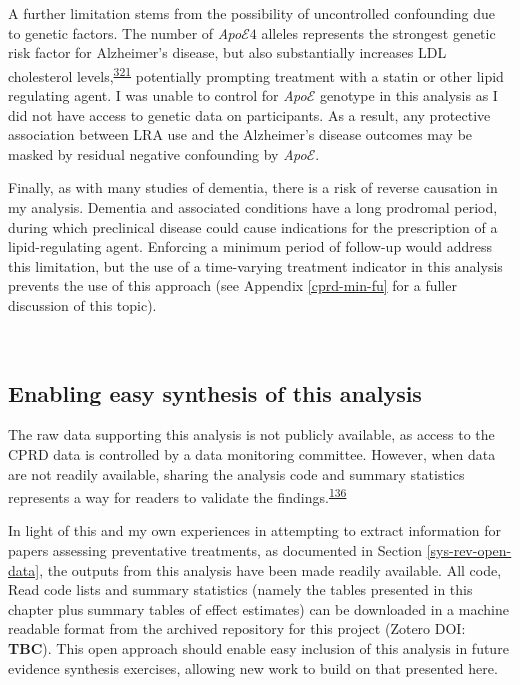\documentclass[a4paper, twoside]{templates/ociamthesis}
\begin{document}
A further limitation stems from the possibility of uncontrolled confounding due to genetic factors. The number of \emph{Apo}\(\mathcal{E}4\) alleles represents the strongest genetic risk factor for Alzheimer's disease, but also substantially increases LDL cholesterol levels,\textsuperscript{\protect\hyperlink{ref-bennet2007}{321}} potentially prompting treatment with a statin or other lipid regulating agent. I was unable to control for \emph{Apo}\(\mathcal{E}\) genotype in this analysis as I did not have access to genetic data on participants. As a result, any protective association between LRA use and the Alzheimer's disease outcomes may be masked by residual negative confounding by \emph{Apo}\(\mathcal{E}\).

Finally, as with many studies of dementia, there is a risk of reverse causation in my analysis. Dementia and associated conditions have a long prodromal period, during which preclinical disease could cause indications for the prescription of a lipid-regulating agent. Enforcing a minimum period of follow-up would address this limitation, but the use of a time-varying treatment indicator in this analysis prevents the use of this approach (see Appendix \ref{cprd-min-fu} for a fuller discussion of this topic).

~

\hypertarget{cprd-data-avail}{%
\subsection{Enabling easy synthesis of this analysis}\label{cprd-data-avail}}

The raw data supporting this analysis is not publicly available, as access to the CPRD data is controlled by a data monitoring committee. However, when data are not readily available, sharing the analysis code and summary statistics represents a way for readers to validate the findings.\textsuperscript{\protect\hyperlink{ref-goldacre2019}{136}}

In light of this and my own experiences in attempting to extract information for papers assessing preventative treatments, as documented in Section \ref{sys-rev-open-data}, the outputs from this analysis have been made readily available. All code, Read code lists and summary statistics (namely the tables presented in this chapter plus summary tables of effect estimates) can be downloaded in a machine readable format from the archived repository for this project (Zotero DOI: \textbf{TBC}). This open approach should enable easy inclusion of this analysis in future evidence synthesis exercises, allowing new work to build on that presented here.
\end{document}
